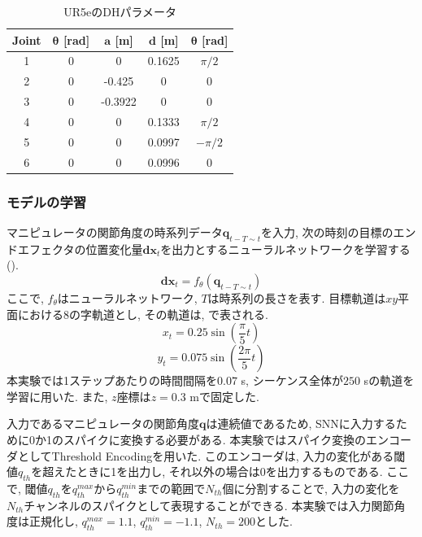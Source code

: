 \begin{table}[htb]
    \centering
    \caption{UR5eのDHパラメータ \cite{ur5e}}
    \label{tab:ur5e:dh}
    \begin{tabular}{ccccc}
        \hline
        \textbf{Joint} & $\bm{\theta}$ [rad] & $\bm{a}$ [m]& $\bm{d}$ [m]& $\bm{\theta}$ [rad]\\
        \hline
        1 & 0 & 0       & 0.1625 & $\pi/2$\\
        2 & 0 & -0.425  & 0       & 0\\
        3 & 0 & -0.3922 & 0       & 0\\
        4 & 0 & 0       & 0.1333 & $\pi/2$\\
        5 & 0 & 0       & 0.0997 & $-\pi/2$\\
        6 & 0 & 0       & 0.0996 & 0\\
        \hline
    \end{tabular}
\end{table}


\subsubsection{モデルの学習}
マニピュレータの関節角度の時系列データ$\bm{q}_{t-T \sim t}$を入力, 次の時刻の目標のエンドエフェクタの位置変化量$\bm{dx}_{t}$を出力とするニューラルネットワークを学習する ().
\begin{equation}
    \bm{dx}_{t} = f_{\theta}(\bm{q}_{t-T \sim t}) \label{eq:model:learning}
\end{equation}
ここで, $f_{\theta}$はニューラルネットワーク, $T$は時系列の長さを表す.
目標軌道は$xy$平面における8の字軌道とし, その軌道は, で表される.
\begin{equation}
    x_t=0.25 \sin (\frac{\pi}{5} t) \label{eq:model:target_trajectoryx}
\end{equation}
\begin{equation}
    y_t=0.075 \sin (\frac{2\pi}{5} t) \label{eq:model:target_trajectoryy}
\end{equation}
本実験では1ステップあたりの時間間隔を$0.07$ s, シーケンス全体が$250$ sの軌道を学習に用いた.
また, $z$座標は$z=0.3$ mで固定した.

入力であるマニピュレータの関節角度$\bm{q}$は連続値であるため, SNNに入力するために0か1のスパイクに変換する必要がある.
本実験ではスパイク変換のエンコーダとしてThreshold Encodingを用いた.
このエンコーダは, 入力の変化がある閾値$q_{th}$を超えたときに1を出力し, それ以外の場合は0を出力するものである.
ここで, 閾値$q_{th}$を$q_{th}^{max}$から$q_{th}^{min}$までの範囲で$N_{th}$個に分割することで, 入力の変化を$N_{th}$チャンネルのスパイクとして表現することができる.
本実験では入力関節角度は正規化し, $q_{th}^{max}=1.1$, $q_{th}^{min}=-1.1$, $N_{th}=200$とした.

